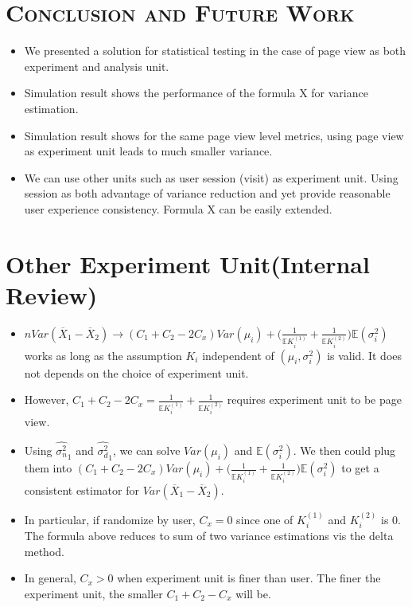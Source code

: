 \documentclass[xcolor=x11names,table]{beamer}
\newcommand{\bbe}{\mathbb{E}}
\newcommand{\wht}{\widehat}
\newcommand{\var}{Var}
\newcommand{\xbar}{\overline{X}}
\newcommand{\naiveest}{\wht{\sigma^2_n}}
\newcommand{\deltaest}{\wht{\sigma^2_d}}
\begin{document}
\section{\scshape Conclusion and Future Work }
\begin{frame}
\begin{itemize}
\item We presented a solution for statistical testing in the case of page view as both experiment and analysis unit.
\item Simulation result shows the performance of the formula X for variance estimation.
\item Simulation result shows for the same page view level metrics, using page view as experiment unit leads to much smaller variance.
\item We can use other units such as user session (visit) as experiment unit. Using session as both advantage of variance reduction and yet provide reasonable user experience consistency.  Formula X can be easily extended. 
\end{itemize}
\end{frame}
 

   
\section{Other Experiment Unit(Internal Review)}
\begin{frame}
\begin{itemize}
\item  $n\var(\xbar_1-\xbar_2) \to (C_1+C_2-2C_x) \var(\mu_i) + \Biggl(\frac{1}{\bbe K_i^{(1)}}+\frac{1}{\bbe K_i^{(2)}}\Biggr )\bbe(\sigma^2_i)$ works as long as the assumption $K_i$ independent of $(\mu_i,\sigma_i^2)$ is valid. \alert{ It does not depends on the choice of experiment unit}.
\item  However, $C_1+C_2-2C_x= \frac{1}{\bbe K_i^{(1)}}+\frac{1}{\bbe K_i^{(2)}}$ requires experiment unit to be page view.
\item Using $\naiveest_1$ and $\deltaest_1$, we  can solve $\var(\mu_i)$ and $\bbe(\sigma_i^2)$. We then could plug them into $(C_1+C_2-2C_x) \var(\mu_i) + \Biggl(\frac{1}{\bbe K_i^{(1)}}+\frac{1}{\bbe K_i^{(2)}}\Biggr )\bbe(\sigma^2_i)$ to get a consistent estimator for $\var(\xbar_1-\xbar_2)$.
\item In particular, if randomize by user, $C_x=0$ since one of $K_i^{(1)}$ and $K_i^{(2)}$ is 0. The formula above reduces to sum of two variance estimations vis the delta method.
\item In general, $C_x>0$ when experiment unit is finer than user. The finer the experiment unit, the smaller $C_1+C_2-C_x$ will be. 
\end{itemize}
\end{frame}
 
\end{document}

